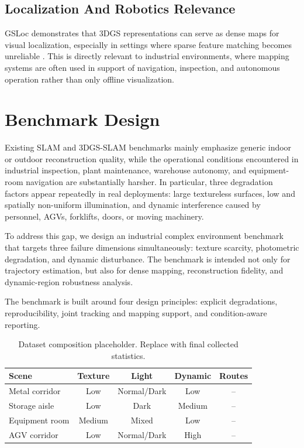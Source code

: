 \documentclass[10pt,twocolumn]{article}
\begin{document}
\subsection{Localization And Robotics Relevance}

GSLoc demonstrates that 3DGS representations can serve as dense maps for visual localization, especially in settings where sparse feature matching becomes unreliable \cite{GSLoc2024}. This is directly relevant to industrial environments, where mapping systems are often used in support of navigation, inspection, and autonomous operation rather than only offline visualization.

\section{Benchmark Design}

Existing SLAM and 3DGS-SLAM benchmarks mainly emphasize generic indoor or outdoor reconstruction quality, while the operational conditions encountered in industrial inspection, plant maintenance, warehouse autonomy, and equipment-room navigation are substantially harsher. In particular, three degradation factors appear repeatedly in real deployments: large textureless surfaces, low and spatially non-uniform illumination, and dynamic interference caused by personnel, AGVs, forklifts, doors, or moving machinery.

To address this gap, we design an industrial complex environment benchmark that targets three failure dimensions simultaneously: texture scarcity, photometric degradation, and dynamic disturbance. The benchmark is intended not only for trajectory estimation, but also for dense mapping, reconstruction fidelity, and dynamic-region robustness analysis.

The benchmark is built around four design principles: explicit degradations, reproducibility, joint tracking and mapping support, and condition-aware reporting.

\begin{table}[t]
    \centering
    \caption{Dataset composition placeholder. Replace with final collected statistics.}
    \begin{tabular}{lcccc}
        \toprule
        Scene & Texture & Light & Dynamic & Routes \\
        \midrule
        Metal corridor & Low & Normal/Dark & Low & -- \\
        Storage aisle & Low & Dark & Medium & -- \\
        Equipment room & Medium & Mixed & Low & -- \\
        AGV corridor & Low & Normal/Dark & High & -- \\
        \bottomrule
    \end{tabular}
    \label{tab:dataset_composition}
\end{table}
\end{document}
